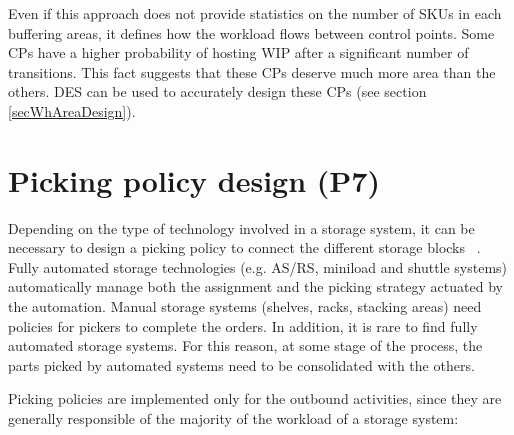 Even if this approach does not provide statistics on the number of SKUs in each buffering areas, it defines how the workload flows between control points. Some CPs have a higher probability of hosting WIP after a significant number of transitions. This fact suggests that these CPs deserve much more area than the others. DES can be used to accurately design these CPs (see section \ref{secWhAreaDesign}).

\section{Picking policy design (P7)}

Depending on the type of technology involved in a storage system, it can be necessary to design a picking policy to connect the different storage blocks ~\cite{Bartholdi1996, Choe1991, Ene2012, Jarvis1991, Lin1999, Marchet2015, Petersen2004, Roodbergen2015, VanGils2017}. Fully automated storage technologies (e.g. AS/RS, miniload and shuttle systems) automatically manage both the assignment and the picking strategy actuated by the automation. Manual storage systems (shelves, racks, stacking areas) need policies for pickers to complete the orders. In addition, it is rare to find fully automated storage systems. For this reason, at some stage of the process, the parts picked by automated systems need to be consolidated with the others.\par

Picking policies are implemented only for the outbound activities, since they are generally responsible of the majority of the workload of a storage system:

